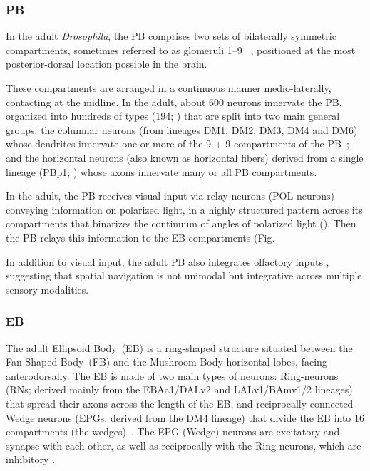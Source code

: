        \subsubsection{PB}
        In the adult \textit{Drosophila}, the PB comprises two sets of bilaterally symmetric compartments, sometimes referred to as glomeruli 1–9 ~\cite{hulse2021connectome}, positioned at the most posterior-dorsal location possible in the brain.

        These compartments are arranged in a continuous manner medio-laterally, contacting at the midline. In the adult, about 600 neurons innervate the PB, organized into hundreds of types (194; \citep{wolff2015neuroarchitecture}) that are split into two main general groups: the columnar neurons (from lineages DM1, DM2, DM3, DM4 and DM6) whose dendrites innervate one or more of the 9 + 9 compartments of the PB~\citep{wolff2015neuroarchitecture}; and the horizontal neurons (also known as horizontal fibers) derived from a single lineage (PBp1; \citep{andrade2019developmentally}) whose axons innervate many or all PB compartments.

        In the adult, the PB receives visual input via relay neurons (POL neurons) conveying information on polarized light, in a highly structured pattern across its compartments that binarizes the continuum of angles of polarized light (\citep{heinze2009transformation}). Then the PB relays this information to the EB compartments (Fig. %

        In addition to visual input, the adult PB also integrates olfactory inputs \citep{hulse2021connectome}, suggesting that spatial navigation is not unimodal but integrative across multiple sensory modalities.
        \subsubsection{EB}
        The adult Ellipsoid Body~(EB) is a ring-shaped structure situated between the Fan-Shaped Body~(FB) and the Mushroom Body horizontal lobes, facing anterodorsally.
        The EB is made of two main types of neurons: Ring-neurons (RNs; derived mainly from the EBAa1/DALv2 and LALv1/BAmv1/2 lineages) that spread their axons across the length of the EB, and reciprocally connected Wedge neurons (EPGs, derived from the DM4 lineage) that divide the EB into 16 compartments (the wedges)~\citep{wolff2015neuroarchitecture}.
        The EPG (Wedge) neurons are excitatory and synapse with each other, as well as reciprocally with the Ring neurons, which are inhibitory \citep{franconville2018building, hulse2021connectome}.

